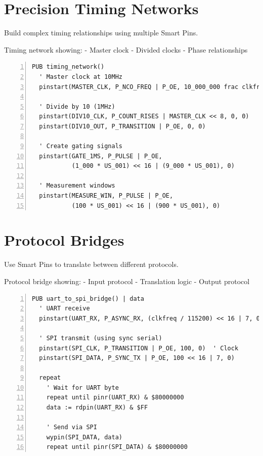 \documentclass[11pt,a4paper,oneside,english]{book}
\begin{document}
\hypertarget{precision-timing-networks}{%
\section{Precision Timing Networks}\label{precision-timing-networks}}

Build complex timing relationships using multiple Smart Pins.

Timing network showing: - Master clock - Divided clocks - Phase
relationships

\begin{Spin2Block}
\begin{Verbatim}[numbers=left,numbersep=5pt,xleftmargin=15pt]
PUB timing_network()
  ' Master clock at 10MHz
  pinstart(MASTER_CLK, P_NCO_FREQ | P_OE, 10_000_000 frac clkfreq, 0)
  
  ' Divide by 10 (1MHz)
  pinstart(DIV10_CLK, P_COUNT_RISES | MASTER_CLK << 8, 0, 0)
  pinstart(DIV10_OUT, P_TRANSITION | P_OE, 0, 0)
  
  ' Create gating signals
  pinstart(GATE_1MS, P_PULSE | P_OE, 
           (1_000 * US_001) << 16 | (9_000 * US_001), 0)
  
  ' Measurement windows
  pinstart(MEASURE_WIN, P_PULSE | P_OE,
           (100 * US_001) << 16 | (900 * US_001), 0)
\end{Verbatim}
\end{Spin2Block}

\hypertarget{protocol-bridges}{%
\section{Protocol Bridges}\label{protocol-bridges}}

Use Smart Pins to translate between different protocols.

Protocol bridge showing: - Input protocol - Translation logic - Output
protocol

\begin{Spin2Block}
\begin{Verbatim}[numbers=left,numbersep=5pt,xleftmargin=15pt]
PUB uart_to_spi_bridge() | data
  ' UART receive
  pinstart(UART_RX, P_ASYNC_RX, (clkfreq / 115200) << 16 | 7, 0)
  
  ' SPI transmit (using sync serial)
  pinstart(SPI_CLK, P_TRANSITION | P_OE, 100, 0)  ' Clock
  pinstart(SPI_DATA, P_SYNC_TX | P_OE, 100 << 16 | 7, 0)
  
  repeat
    ' Wait for UART byte
    repeat until pinr(UART_RX) & $80000000
    data := rdpin(UART_RX) & $FF
    
    ' Send via SPI
    wypin(SPI_DATA, data)
    repeat until pinr(SPI_DATA) & $80000000
\end{Verbatim}
\end{Spin2Block}
\end{document}
